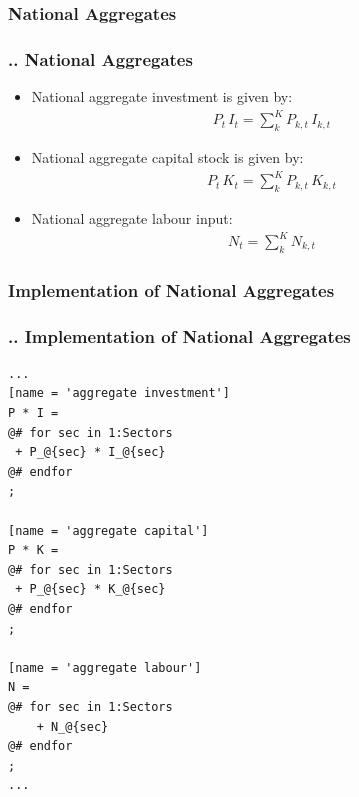 \documentclass[11pt,aspectratio=169]{beamer}
\begin{document}
\subsubsection{National Aggregates}
\begin{frame}
\frametitle{{\thesection.\thesubsection.\thesubsubsection} National Aggregates}
\scriptsize
\begin{itemize}
\item National aggregate investment is given by:
\begin{align*}
P_{t} \, I_{t} = \sum_{k}^{K} P_{k,t} \, I_{k,t}
\end{align*}
\item National aggregate capital stock is given by:
\begin{align*}
P_{t} \, K_{t} = \sum_{k}^{K} P_{k,t} \, K_{k,t}
\end{align*}
\item National aggregate labour input:
\begin{align*}
N_{t} = \sum_{k}^{K} N_{k,t}
\end{align*}

\end{itemize}
\end{frame}

\subsubsection{Implementation of National Aggregates}
\begin{frame}[fragile]
\frametitle{{\thesection.\thesubsection.\thesubsubsection} Implementation of National Aggregates}

\begin{lstlisting}[frame = single]
...
[name = 'aggregate investment']
P * I = 
@# for sec in 1:Sectors
 + P_@{sec} * I_@{sec}
@# endfor
;

[name = 'aggregate capital']
P * K = 
@# for sec in 1:Sectors
 + P_@{sec} * K_@{sec}
@# endfor
;

[name = 'aggregate labour']
N = 
@# for sec in 1:Sectors
    + N_@{sec}
@# endfor
;
...
\end{lstlisting}
\end{frame}
\end{document}
